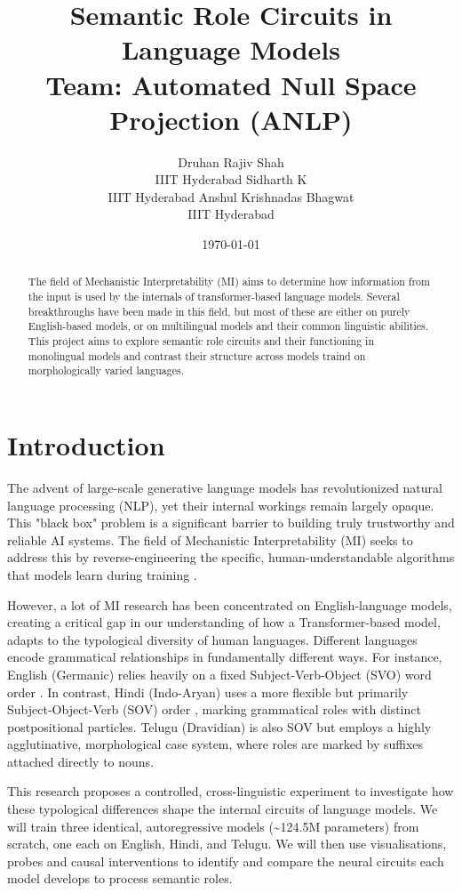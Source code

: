 \documentclass[11pt]{article}
\author{Druhan Rajiv Shah \\ IIIT Hyderabad \And Sidharth K \\ IIIT Hyderabad \And Anshul Krishnadas Bhagwat \\ IIIT Hyderabad}
\date{\today}
\title{Semantic Role Circuits in Language Models\\\medskip
\large Team: Automated Null Space Projection (ANLP)}
\begin{document}
\maketitle
\begin{abstract}
The field of Mechanistic Interpretability (MI) aims to determine how information from the input is used by the internals of transformer-based language models. Several breakthroughs have been made in this field, but most of these are either on purely English-based models, or on multilingual models and their common linguistic abilities. This project aims to explore semantic role circuits and their functioning in monolingual models and contrast their structure across models traind on morphologically varied languages.
\end{abstract}
\section{Introduction}
\label{sec:org77368ac}

The advent of large-scale generative language models has revolutionized natural language processing (NLP), yet their internal workings remain largely opaque. This "black box" problem is a significant barrier to building truly trustworthy and reliable AI systems. The field of Mechanistic Interpretability (MI) seeks to address this by reverse-engineering the specific, human-understandable algorithms that models learn during training \citep{elhage2021mathematical}.

However, a lot of MI research has been concentrated on English-language models, creating a critical gap in our understanding of how a Transformer-based model, adapts to the typological diversity of human languages. Different languages encode grammatical relationships in fundamentally different ways. For instance, English (Germanic) relies heavily on a fixed Subject-Verb-Object (SVO) word order . In contrast, Hindi (Indo-Aryan) uses a more flexible but primarily Subject-Object-Verb (SOV) order \citep{verma1970word}, marking grammatical roles with distinct postpositional particles. Telugu (Dravidian) is also SOV but employs a highly agglutinative, morphological case system, where roles are marked by suffixes attached directly to nouns.

This research proposes a controlled, cross-linguistic experiment to investigate how these typological differences shape the internal circuits of language models. We will train three identical, autoregressive models (\textasciitilde{}124.5M parameters) from scratch, one each on English, Hindi, and Telugu. We will then use visualisations, probes and causal interventions to identify and compare the neural circuits each model develops to process semantic roles.
\end{document}
